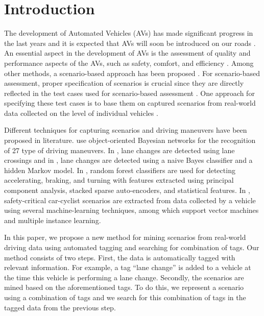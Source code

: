 \section{Introduction}
\label{sec:introduction}

\cstarta
The development of Automated Vehicles (AVs) has made significant progress in the last years and it is expected that AVs will soon be introduced on our roads \autocite{bimbraw2015autonomous, madni2018autonomous}. 
An essential aspect in the development of AVs is the assessment of quality and performance aspects of the AVs, such as safety, comfort, and efficiency \autocite{bengler2014threedecades, stellet2015taxonomy}. 
Among other methods, a scenario-based approach has been proposed \autocite{elrofai2018scenario, putz2017pegasus}. 
For scenario-based assessment, proper specification of scenarios is crucial since they are directly reflected in the test cases used for scenario-based assessment \autocite{stellet2015taxonomy}. 
One approach for specifying these test cases is to base them on captured scenarios from real-world data collected on the level of individual vehicles \autocite{elrofai2018scenario, putz2017pegasus, roesener2016scenariobased, deGelder2017assessment}. 

Different techniques for capturing scenarios and driving maneuvers have been proposed in literature. 
\textcite{kasper2012oobayesnetworks} use object-oriented Bayesian networks for the recognition of 27 type of driving maneuvers. 
In \autocite{krajewski2018highD}, lane changes are detected using lane crossings and in \autocite{schlechtriemen2015lanechange}, lane changes are detected using a naive Bayes classifier and a hidden Markov model. 
In \cite{xie2017driving}, random forest classifiers are used for detecting accelerating, braking, and turning with features extracted using principal component analysis, stacked sparse auto-encoders, and statistical features.
In \autocite{cara2015carcyclist}, safety-critical car-cyclist scenarios are extracted from data collected by a vehicle using several machine-learning techniques, among which support vector machines and multiple instance learning.

In this paper, we propose a new method for mining scenarios from real-world driving data using automated tagging and searching for combination of tags. 
Our method consists of two steps. First, the data is automatically tagged with relevant information. For example, a tag ``lane change'' is added to a vehicle at the time this vehicle is performing a lane change. 
Secondly, the scenarios are mined based on the aforementioned tags. \cenda
\cstartd To do this, we represent a scenario using a combination of tags and we search for this combination of tags in the tagged data from the previous step. \cendd

